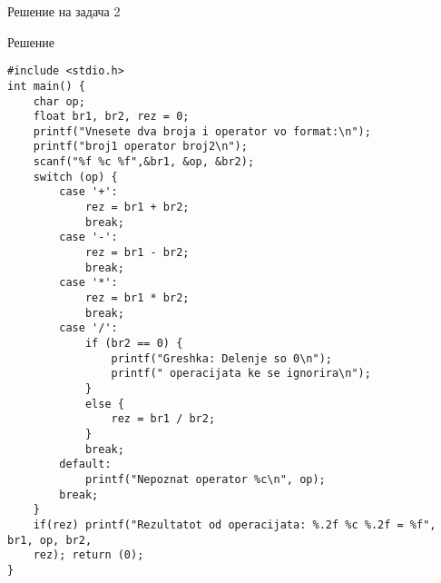 \begin{frame}[fragile,shrink=10]{Решение на задача 2}
\begin{exampleblock}{Решение}
\begin{lstlisting}
#include <stdio.h>
int main() {
    char op;
    float br1, br2, rez = 0;
    printf("Vnesete dva broja i operator vo format:\n");
    printf("broj1 operator broj2\n");
    scanf("%f %c %f",&br1, &op, &br2);
    switch (op) {
        case '+':
            rez = br1 + br2;
            break;
        case '-':
            rez = br1 - br2;
            break;
        case '*':
            rez = br1 * br2;
            break;
        case '/':
            if (br2 == 0) {
                printf("Greshka: Delenje so 0\n");
                printf(" operacijata ke se ignorira\n");
            }
            else {
                rez = br1 / br2;
            }
            break;
        default:
            printf("Nepoznat operator %c\n", op);
        break;
    }
    if(rez) printf("Rezultatot od operacijata: %.2f %c %.2f = %f", br1, op, br2,
    rez); return (0);
}
\end{lstlisting}
\end{exampleblock}
\end{frame}

